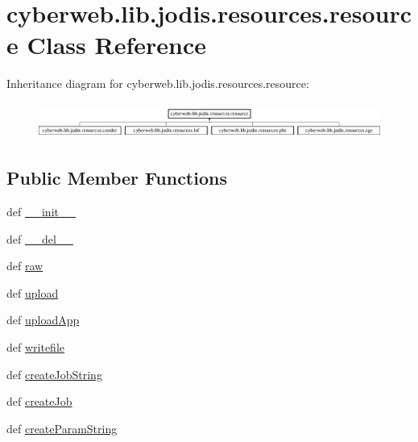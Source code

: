 \hypertarget{classcyberweb_1_1lib_1_1jodis_1_1resources_1_1resource}{\section{cyberweb.\-lib.\-jodis.\-resources.\-resource \-Class \-Reference}
\label{classcyberweb_1_1lib_1_1jodis_1_1resources_1_1resource}
}
\-Inheritance diagram for cyberweb.\-lib.\-jodis.\-resources.\-resource\-:\begin{figure}[H]
\begin{center}
\leavevmode
\includegraphics[height=1.171548cm]{classcyberweb_1_1lib_1_1jodis_1_1resources_1_1resource}
\end{center}
\end{figure}
\subsection*{\-Public \-Member \-Functions}
\begin{DoxyCompactItemize}
\item 
def \hyperlink{classcyberweb_1_1lib_1_1jodis_1_1resources_1_1resource_ab2b3bf482f983a6d05296f764c92d88e}{\-\_\-\-\_\-init\-\_\-\-\_\-}
\item 
def \hyperlink{classcyberweb_1_1lib_1_1jodis_1_1resources_1_1resource_aa168c5ed9b9cf18f188432e71d0cc328}{\-\_\-\-\_\-del\-\_\-\-\_\-}
\item 
def \hyperlink{classcyberweb_1_1lib_1_1jodis_1_1resources_1_1resource_af9075927d9c183fb6cb8352957c374e0}{raw}
\item 
def \hyperlink{classcyberweb_1_1lib_1_1jodis_1_1resources_1_1resource_a8e4a2bdbfaf2233f3dcdd8477a4fbcde}{upload}
\item 
def \hyperlink{classcyberweb_1_1lib_1_1jodis_1_1resources_1_1resource_af5c15ff57444d05ae384da2dd44dd078}{upload\-App}
\item 
def \hyperlink{classcyberweb_1_1lib_1_1jodis_1_1resources_1_1resource_a96fe42e90c35ab6cf71ccaa032471632}{writefile}
\item 
def \hyperlink{classcyberweb_1_1lib_1_1jodis_1_1resources_1_1resource_a54d49f03e7cf0272217b93c04b11f402}{create\-Job\-String}
\item 
def \hyperlink{classcyberweb_1_1lib_1_1jodis_1_1resources_1_1resource_aede5702fbb5a2119cbcee33a92b5196d}{create\-Job}
\item 
def \hyperlink{classcyberweb_1_1lib_1_1jodis_1_1resources_1_1resource_a244747d974d4f22680f8553f4d19d9b3}{create\-Param\-String}
\end{DoxyCompactItemize}
